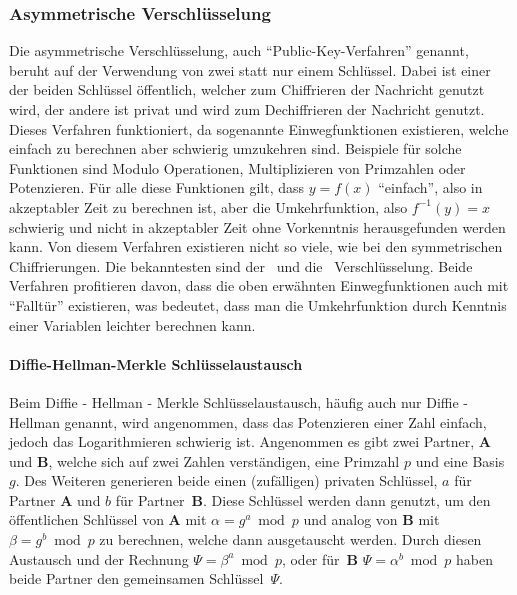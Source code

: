 	\subsubsection{Asymmetrische Verschlüsselung}\label{subsubsec:asymVersch}
		Die asymmetrische Verschlüsselung,
		auch \enquote{Public-Key-Verfahren} genannt,
		beruht auf der Verwendung von zwei statt nur einem Schlüssel.
		Dabei ist einer der beiden Schlüssel öffentlich,
		welcher zum Chiffrieren der Nachricht genutzt wird,
		der andere ist privat und wird zum Dechiffrieren der Nachricht genutzt.
		Dieses Verfahren funktioniert,
		da sogenannte Einwegfunktionen existieren,
		welche einfach zu berechnen aber schwierig umzukehren sind.
		Beispiele für solche Funktionen sind Modulo Operationen,
		Multiplizieren von Primzahlen oder Potenzieren.
		Für alle diese Funktionen gilt,
		dass $y = f(x)$ \enquote{einfach},
		also in akzeptabler Zeit zu berechnen ist,
		aber die Umkehrfunktion,
		also $f^{-1}(y) = x$ schwierig und
		nicht in akzeptabler Zeit ohne Vorkenntnis herausgefunden werden kann.
		Von diesem Verfahren existieren nicht so viele,
		wie bei den symmetrischen Chiffrierungen.
		Die bekanntesten sind der~ und
		die~ Verschlüsselung.
		Beide Verfahren profitieren davon,
		dass die oben erwähnten Einwegfunktionen auch mit \enquote{Falltür} existieren,
		was bedeutet, dass man die Umkehrfunktion durch Kenntnis einer Variablen leichter berechnen kann.

		\paragraph{Diffie-Hellman-Merkle Schlüsselaustausch}\label{p:DiffieHellmanMerkleSchluesselaustausch}
			Beim Diffie - Hellman - Merkle Schlüsselaustausch,
			häufig auch nur Diffie - Hellman genannt,
			wird angenommen, dass das Potenzieren einer Zahl einfach,
			jedoch das Logarithmieren schwierig ist.
			Angenommen es gibt zwei Partner, \textbf{A} und \textbf{B},
			welche sich auf zwei Zahlen verständigen,
			eine Primzahl $p$ und eine Basis~$g$.
			Des Weiteren generieren beide einen (zufälligen) privaten Schlüssel,
			$a$ für Partner \textbf{A} und $b$ für Partner~\textbf{B}.
			Diese Schlüssel werden dann genutzt,
			um den öffentlichen Schlüssel von \textbf{A} mit $\alpha = g^{a}\bmod p$
			und analog von \textbf{B} mit~$\beta = g^{b} \bmod p$ zu berechnen,
			welche dann ausgetauscht werden.
			Durch diesen Austausch und der Rechnung $\Psi = \beta^{a}\bmod p$,
			oder für~\textbf{B} $\Psi =\alpha^{b}\bmod p$ haben beide Partner den gemeinsamen Schlüssel~$\Psi$.

